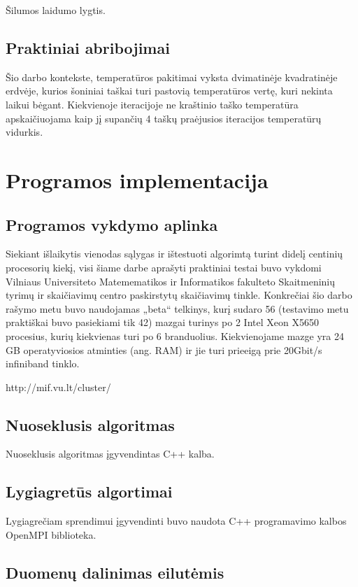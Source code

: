\documentclass{VUMIFPSbakalaurinis}
\begin{document}
Šilumos laidumo lygtis.

\subsection{Praktiniai abribojimai}

Šio darbo kontekste, temperatūros pakitimai vyksta dvimatinėje kvadratinėje erdvėje, kurios šoniniai taškai turi pastovią temperatūros vertę, kuri nekinta laikui bėgant.
Kiekvienoje iteracijoje ne kraštinio taško temperatūra apskaičiuojama kaip jį supančių 4 taškų praėjusios iteracijos temperatūrų vidurkis.

\section{Programos implementacija}

\subsection{Programos vykdymo aplinka}

Siekiant išlaikytis vienodas sąlygas ir ištestuoti algorimtą turint didelį centinių procesorių kiekį, visi šiame darbe aprašyti praktiniai testai buvo vykdomi Vilniaus Universiteto Matemematikos ir Informatikos fakulteto Skaitmeninių tyrimų ir skaičiavimų centro paskirstytų skaičiavimų tinkle.
Konkrečiai šio darbo rašymo metu buvo naudojamas „beta“ telkinys, kurį sudaro 56 (testavimo metu praktiškai buvo pasiekiami tik 42) mazgai turinys po 2 Intel Xeon X5650 procesius, kurių kiekvienas turi po 6 branduolius. 
Kiekvienojame mazge yra 24 GB operatyviosios atminties (ang. RAM) ir jie turi prieeigą prie 20Gbit/s infiniband tinklo. 

http://mif.vu.lt/cluster/

\subsection{Nuoseklusis algoritmas}

Nuoseklusis algoritmas įgyvendintas C++ kalba. 

\subsection{Lygiagretūs algortimai}

Lygiagrečiam sprendimui įgyvendinti buvo naudota C++ programavimo kalbos OpenMPI biblioteka.

\subsection{Duomenų dalinimas eilutėmis}
\end{document}
